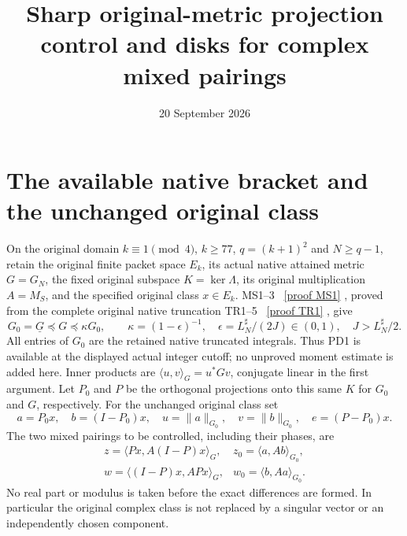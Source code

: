 \documentclass[11pt]{article}
\title{Sharp original-metric projection control and disks for complex mixed pairings}
\author{}
\date{20 September 2026}
\begin{document}
\maketitle

\section{The available native bracket and the unchanged original class}
On the original domain $k\equiv1\pmod4$, $k\ge77$, $q=(k+1)^2$
and $N\ge q-1$, retain the original finite packet space $E_k$, its actual native attained
metric $G=G_N$, the fixed original subspace $K=\ker\Lambda$, its original
multiplication $A=M_S$, and the specified original class $x\in E_k$.
MS1--3 \cite{MS}%
~\href{https://github.com/KokunoYumeto/zeta-function-research-reader/blob/5992ad50c0f2a06921f1fcaded7b4e38097c0739/workbenches/splitzero-tandem/continuations/20260920-original-kernel-mixed-determinants/providers/NATIVE_METRIC_SINGULAR_VALUE_BRACKETS.tex\#L25}{[proof MS1]}%
{}, proved from the complete original native truncation
TR1--5 \cite{TR}%
~\href{https://github.com/KokunoYumeto/zeta-function-research-reader/blob/5992ad50c0f2a06921f1fcaded7b4e38097c0739/workbenches/splitzero-tandem/continuations/20260920-original-kernel-mixed-determinants/providers/NATIVE_TRUNCATION_CONDUCTOR_RETURN.tex\#L54}{[proof TR1]}%
{}, give
\[
 G_0=\underline G\preceq G\preceq\kappa G_0,\qquad
 \kappa=(1-\epsilon)^{-1},\quad
 \epsilon=L_N^\sharp/(2J)\in(0,1),\quad J>L_N^\sharp/2.          \tag{PD1}
\]
All entries of $G_0$ are the retained native truncated integrals.
Thus PD1 is available at the displayed actual integer cutoff; no
unproved moment estimate is added here.  Inner products are
$\langle u,v\rangle_G=u^*Gv$, conjugate linear in the first argument.
Let $P_0$ and $P$ be the orthogonal projections onto this same $K$
for $G_0$ and $G$, respectively.  For the unchanged original class set
\[
 a=P_0x,\quad b=(I-P_0)x,\quad
 u=\|a\|_{G_0},\quad v=\|b\|_{G_0},\quad
 e=(P-P_0)x.
                                                                    \tag{PD2}
\]
The two mixed pairings to be controlled, including their phases, are
\[
 \begin{array}{ll}
 z=\langle Px,A(I-P)x\rangle_G,
   &z_0=\langle a,Ab\rangle_{G_0},\\
 w=\langle(I-P)x,APx\rangle_G,
   &w_0=\langle b,Aa\rangle_{G_0}.
 \end{array}                                                       \tag{PD3}
\]
No real part or modulus is taken before the exact differences are
formed.  In particular the original complex class is not replaced
by a singular vector or an independently chosen component.
\end{document}
